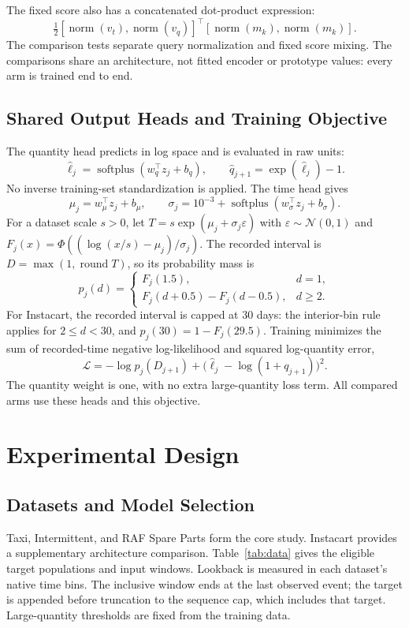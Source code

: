 \documentclass[runningheads]{llncs}
\newcommand{\softplus}{\operatorname{softplus}}
\newcommand{\Nrm}{\operatorname{norm}}
\begin{document}
The fixed score also has a concatenated dot-product expression:
\begin{equation}
 \tfrac12[\Nrm(v_t),\Nrm(v_q)]^\top[\Nrm(m_k),\Nrm(m_k)].
\end{equation}
The comparison tests separate query normalization and fixed score mixing. The comparisons share an architecture, not fitted encoder or prototype values: every arm is trained end to end.

\subsection{Shared Output Heads and Training Objective}
The quantity head predicts in log space and is evaluated in raw units:
\begin{equation}
 \widehat\ell_j=\softplus(w_q^\top z_j+b_q),\qquad
 \widehat q_{j+1}=\exp(\widehat\ell_j)-1.
\end{equation}
No inverse training-set standardization is applied. The time head gives
\begin{equation}
 \mu_j=w_\mu^\top z_j+b_\mu,\qquad
 \sigma_j=10^{-3}+\softplus(w_\sigma^\top z_j+b_\sigma).
\end{equation}
For a dataset scale $s>0$, let $T=s\exp(\mu_j+\sigma_j\varepsilon)$ with $\varepsilon\sim\mathcal N(0,1)$ and $F_j(x)=\Phi((\log(x/s)-\mu_j)/\sigma_j)$. The recorded interval is $D=\max(1,\operatorname{round}T)$, so its probability mass is
\begin{equation}
 p_j(d)=
 \begin{cases}
 F_j(1.5),& d=1,\\
 F_j(d+0.5)-F_j(d-0.5),& d\geq2.
 \end{cases}
 \label{eq:time}
\end{equation}
For Instacart, the recorded interval is capped at 30 days: the interior-bin rule applies for $2\leq d<30$, and $p_j(30)=1-F_j(29.5)$. Training minimizes the sum of recorded-time negative log-likelihood and squared log-quantity error,
\begin{equation}
 \mathcal L=-\log p_j(D_{j+1})+
   \bigl(\widehat\ell_j-\log(1+q_{j+1})\bigr)^2.
\end{equation}
The quantity weight is one, with no extra large-quantity loss term. All compared arms use these heads and this objective.

\section{Experimental Design}
\subsection{Datasets and Model Selection}
Taxi, Intermittent, and RAF Spare Parts form the core study. Instacart provides a supplementary architecture comparison. Table~\ref{tab:data} gives the eligible target populations and input windows. Lookback is measured in each dataset's native time bins. The inclusive window ends at the last observed event; the target is appended before truncation to the sequence cap, which includes that target. Large-quantity thresholds are fixed from the training data.
\end{document}
